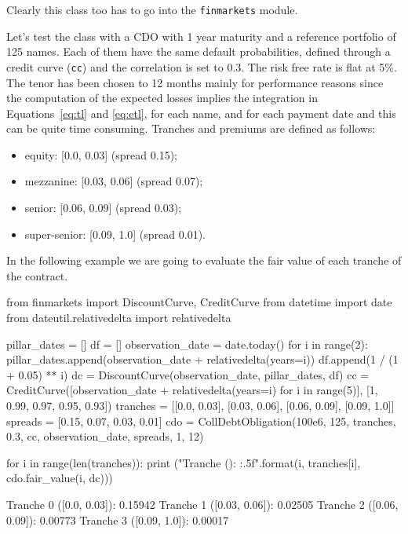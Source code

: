 \begin{finmarkets}
Clearly this class too has to go into the \texttt{finmarkets} module.
\end{finmarkets}
Let's test the class with a CDO with 1 year maturity and a reference portfolio of 125 names. Each of them have the same default probabilities, defined through a credit curve (\texttt{cc}) and the correlation is set to 0.3. The risk free rate is flat at 5\%. The tenor has been chosen to 12 months mainly for performance reasons since the computation of the expected losses implies the integration in Equations~\ref{eq:tl} and \ref{eq:etl}, for each name, and for each payment date and this can be quite time consuming.
Tranches and premiums are defined as follows:
\begin{itemize}
	\item equity: [0.0, 0.03] (spread 0.15);
	\item mezzanine: [0.03, 0.06] (spread 0.07);
	\item senior: [0.06, 0.09] (spread 0.03);
	\item super-senior: [0.09, 1.0] (spread 0.01).
\end{itemize}

In the following example we are going to evaluate the fair value of each tranche of the contract.

\begin{ipython}
from finmarkets import DiscountCurve, CreditCurve
from datetime import date
from dateutil.relativedelta import relativedelta

pillar_dates = []
df = []
observation_date = date.today()
for i in range(2):
    pillar_dates.append(observation_date + relativedelta(years=i))
    df.append(1 / (1 + 0.05) ** i)
dc = DiscountCurve(observation_date, pillar_dates, df)
cc = CreditCurve([observation_date + relativedelta(years=i) for i in range(5)],
                 [1, 0.99, 0.97, 0.95, 0.93])
tranches = [[0.0, 0.03], [0.03, 0.06], [0.06, 0.09], [0.09, 1.0]]
spreads = [0.15, 0.07, 0.03, 0.01]
cdo = CollDebtObligation(100e6, 125, tranches, 0.3, cc,
                         observation_date, spreads, 1, 12)
          
for i in range(len(tranches)):
    print ("Tranche {} ({}): {:.5f}".format(i, tranches[i], cdo.fair_value(i, dc)))
\end{ipython}
\begin{ioutput}
Tranche 0 ([0.0, 0.03]): 0.15942
Tranche 1 ([0.03, 0.06]): 0.02505
Tranche 2 ([0.06, 0.09]): 0.00773
Tranche 3 ([0.09, 1.0]): 0.00017
\end{ioutput}

